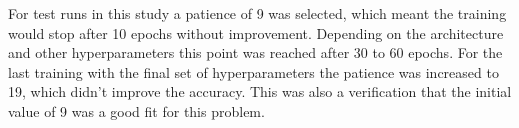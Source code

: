 For test runs in this study a patience of 9 was selected, which meant the training would stop after 10 epochs without improvement. Depending on the architecture and other hyperparameters this point was reached after 30 to 60 epochs. For the last training with the final set of hyperparameters the patience was increased to 19, which didn't improve the accuracy.  This was also a verification that the initial value of 9 was a good fit for this problem.



\newpage
